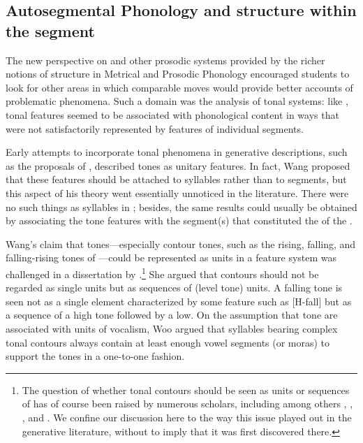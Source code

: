 \subsection{Autosegmental Phonology and structure within the segment}
\label{sec:autosegmental}

The new perspective on  and other prosodic systems provided by
the richer notions of structure in Metrical and Prosodic Phonology
encouraged students to look for other areas in which comparable moves
would provide better accounts of problematic phenomena. Such a domain
was the analysis of tonal systems: like , tonal features seemed
to be associated with phonological content in ways that were not
satisfactorily represented by features of individual segments.

Early attempts to incorporate tonal phenomena in generative
descriptions, such as the proposals of \citet{wang67:tone.features},
described tones as unitary features. In fact, Wang proposed that these
features should be attached to syllables rather than to segments, but
this aspect of his theory went essentially unnoticed in the
literature. There were no such things as syllables in ;
besides, the same results could usually be obtained by associating the
tone features with the segment(s) that constituted the  of the
.

Wang's claim that tones---especially contour tones, such as the
rising, falling, and falling-rising tones of —could be
represented as units in a feature system was challenged in a
dissertation by \citet{woo69:thesis}.\footnote{The question of whether
  tonal contours should be seen as units or sequences of  has of
  course been raised by numerous scholars, including among others
  {\Trubetzkoy}, {\Sapir}, {\Pike}, {\Hjelmslev} and {\Martinet}. We confine our
  discussion here to the way this issue played out in the generative
  literature, without  to imply that it was first discovered
  there.} She argued that contours should not be regarded as single
units but as sequences of (level tone) units. A falling tone is seen
not as a single element characterized by some feature such as
{[H-fall]} but as a sequence of a high tone followed by a low. On the
assumption that tone  are associated with units of vocalism, Woo
argued that syllables bearing complex tonal contours always contain at
least enough vowel segments (or moras) to support the tones in a
one-to-one fashion.

